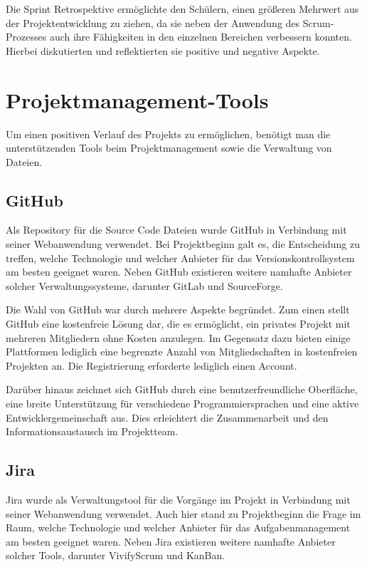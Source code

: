 Die Sprint Retrospektive ermöglichte den Schülern, einen größeren Mehrwert aus der Projektentwicklung zu ziehen, da sie
neben der Anwendung des Scrum-Prozesses auch ihre Fähigkeiten in den einzelnen Bereichen verbessern konnten. Hierbei
diskutierten und reflektierten sie positive und negative Aspekte.

\section{Projektmanagement-Tools}
Um einen positiven Verlauf des Projekts zu ermöglichen, benötigt man die unterstützenden
Tools beim Projektmanagement sowie die Verwaltung von Dateien.

\subsection{GitHub}

Als Repository für die Source Code Dateien wurde GitHub in Verbindung mit seiner Webanwendung verwendet. Bei Projektbeginn
galt es, die Entscheidung zu treffen, welche Technologie und welcher Anbieter für das Versionskontrollsystem am besten
geeignet waren. Neben GitHub existieren weitere namhafte Anbieter solcher Verwaltungssysteme, darunter GitLab und SourceForge.

Die Wahl von GitHub war durch mehrere Aspekte begründet. Zum einen stellt GitHub eine kostenfreie Lösung dar, die es
ermöglicht, ein privates Projekt mit mehreren Mitgliedern ohne Kosten anzulegen. Im Gegensatz dazu bieten einige Plattformen
lediglich eine begrenzte Anzahl von Mitgliedschaften in kostenfreien Projekten an. Die Registrierung erforderte lediglich
einen Account.

Darüber hinaus zeichnet sich GitHub durch eine benutzerfreundliche Oberfläche, eine breite Unterstützung für verschiedene
Programmiersprachen und eine aktive Entwicklergemeinschaft aus. Dies erleichtert die Zusammenarbeit und den Informationsaustausch
im Projektteam.

\subsection{Jira}

Jira wurde als Verwaltungstool für die Vorgänge im Projekt in Verbindung mit seiner Webanwendung verwendet. Auch hier
stand zu Projektbeginn die Frage im Raum, welche Technologie und welcher Anbieter für das Aufgabenmanagement am besten
geeignet waren. Neben Jira existieren weitere namhafte Anbieter solcher Tools, darunter VivifyScrum und KanBan.

